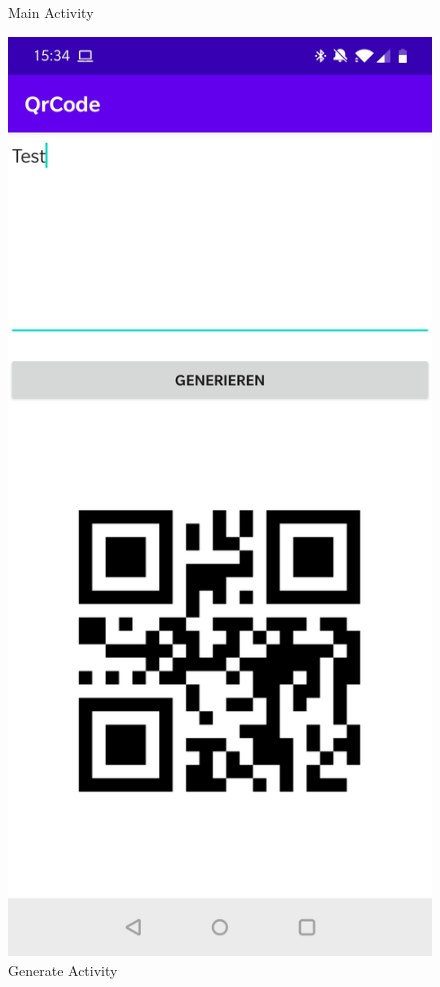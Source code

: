 \documentclass[12pt,					%
							 oneside,			%
							 a4paper,			%
							 halfparskip,		%
							 liststotoc,			%
							 bibtotoc,			%
							 fleqn,				%
							 pointlessnumbers]	%
							 {scrreprt}
\begin{document}
\begin{figure}[ht]
\begin{minipage}[b]{.4\linewidth}
 	\caption{Main Activity}
   \end{minipage}
   \hspace{.1\linewidth}%
   \begin{minipage}[b]{.4\linewidth} %
	\centering
	\includegraphics[scale=0.1]{pictures/Generate} 
	\caption{Generate Activity}
   \end{minipage}
\end{figure}
\newpage
\end{document}
